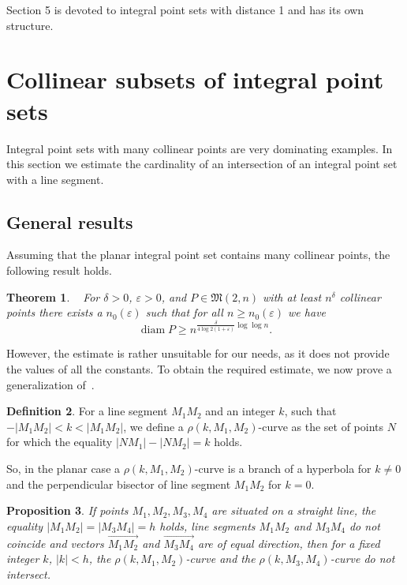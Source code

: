 \documentclass[a4paper,14pt]{article} %
\theoremstyle{plain}
\newtheorem{theorem}{Theorem}[section]
\newtheorem{proposition}[theorem]{Proposition}
\theoremstyle{definition}
\newtheorem{definition}[theorem]{Definition}
\begin{document}
Section 5 is devoted to integral point sets with distance 1 and has its own structure.


\section{Collinear subsets of integral point sets}
Integral point sets with many collinear points are very dominating examples.
In this section we estimate the cardinality of an intersection of an integral point set with a line segment.

\subsection{General results}

Assuming that the planar integral point set contains many collinear points,
the following result holds.
\begin{theorem}~\cite[Theorem 4]{kurz2008minimum}
	For $\delta > 0$, $\varepsilon > 0$, and $P\in\mathfrak{M}(2,n)$ with
	at least $n^\delta$ collinear points there exists a $n_0 (\varepsilon)$
	such that for all $n \geq n_0 (\varepsilon)$ we have
	\begin{equation}
		\operatorname{diam} P \geq n^{\frac{\delta}{4 \log 2(1+\varepsilon)}\log \log n}
		.
	\end{equation}
\end{theorem}
However, the estimate is rather unsuitable for our needs,
as it does not provide the values of all the constants.
To obtain the required estimate, we now prove a generalization of~\cite[Lemma 3]{our-vmmsh-2018-translit}.

\begin{definition}
	For a line segment $M_1 M_2$ and an integer $k$, such that $-|M_1 M_2| < k < |M_1 M_2|$,
	we define a $\rho(k,M_1, M_2)$-curve as the set of points $N$
	for which the equality $|N M_1| - |N M_2| = k$ holds.
\end{definition}
So, in the planar case a $\rho(k,M_1, M_2)$-curve
is a branch of a hyperbola for $k\neq 0$ and the perpendicular bisector of line segment $M_1 M_2$ for $k=0$.

\begin{proposition}
	\label{obs:rho_curves}
	If points $M_1,M_2,M_3,M_4$ are situated on a straight line,
	the equality $|M_1 M_2| = |M_3 M_4| =h $ holds, line segments $M_1 M_2$ and $M_3 M_4$ do not coincide
	and vectors $\overrightarrow{M_1 M_2}$ and $\overrightarrow{M_3 M_4}$ are of equal direction,
	then for a fixed integer $k$, $|k| < h$, the $\rho(k,M_1, M_2)$-curve and the $\rho(k,M_3, M_4)$-curve
	do not intersect.
\end{proposition}
\end{document}
